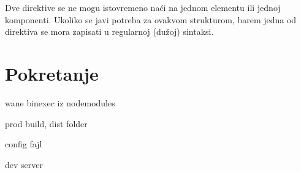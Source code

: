 Dve direktive se ne mogu istovremeno naći na jednom elementu ili jednoj komponenti.
Ukoliko se javi potreba za ovakvom strukturom, barem jedna od direktiva se mora zapisati u regularnoj (dužoj) sintaksi.

\subsection{}

\section{Pokretanje}

wane binexec iz nodemodules

prod build, dist folder

config fajl

dev server
